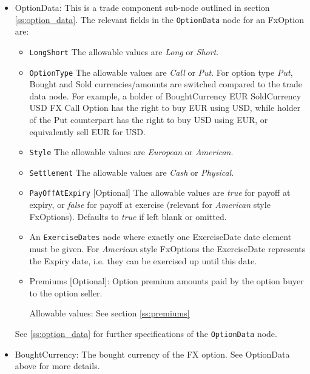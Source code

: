 \begin{itemize}
\item OptionData: This is a trade component sub-node outlined in section \ref{ss:option_data}. 
The relevant fields in the \lstinline!OptionData! node for an FxOption are:

\begin{itemize}
\item \lstinline!LongShort! The allowable values are \emph{Long} or \emph{Short}.

\item \lstinline!OptionType! The allowable values are \emph{Call} or \emph{Put}. For option type \emph{Put}, Bought and Sold currencies/amounts are switched compared to the trade data node.
For example, a holder of BoughtCurrency EUR SoldCurrency USD FX Call Option has the right to buy EUR using USD, while
holder of the Put counterpart has the right to buy USD using EUR, or equivalently sell EUR for USD.

\item  \lstinline!Style! The allowable values are \emph{European} or \emph{American}.

\item  \lstinline!Settlement! The allowable values are \emph{Cash} or \emph{Physical}.

\item \lstinline!PayOffAtExpiry! [Optional] The allowable values are \emph{true} for payoff at expiry, or \emph{false} for payoff at exercise (relevant for \emph{American} style FxOptions). Defaults to \emph{true} if left blank or omitted.

\item An \lstinline!ExerciseDates! node where exactly one ExerciseDate date element must be given. For \emph{American} style FxOptions the ExerciseDate represents the Expiry date, i.e. they can be exercised up until this date. \\

\item Premiums [Optional]: Option premium amounts paid by the option buyer to the option seller.

Allowable values:  See section \ref{ss:premiums}

\end{itemize}

 See \ref{ss:option_data} for further specifications of the \lstinline!OptionData! node.


\item BoughtCurrency: The bought currency of the FX option. See OptionData above for more details.


\end{itemize}
